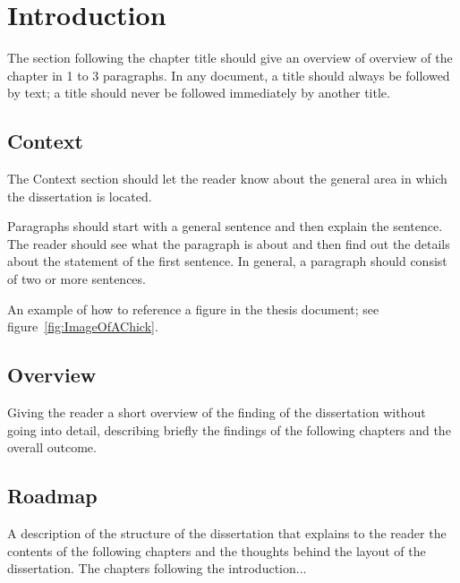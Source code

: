 \chapter{Introduction}

The section following the chapter title should give an overview of overview of the chapter in 1 to 3 paragraphs. In any document, a title should always be followed by text; a title should never be followed immediately by another title.


\section{Context}

The Context section should let the reader know about the general area in which the dissertation is located.

Paragraphs should start with a general sentence and then explain the sentence. The reader should see what the paragraph is about and then find out the details about the statement of the first sentence. In general, a paragraph should consist of two or more sentences. 

An example of how to reference a figure in the thesis document; see figure~\ref{fig:ImageOfAChick}.



\section{Overview} 

Giving the reader a short overview of the finding of the dissertation without going into detail, describing briefly the findings of the following chapters and the overall outcome.


\section{Roadmap}

A description of the structure of the dissertation that explains to the reader the contents of the following chapters and the thoughts behind the layout of the dissertation. The chapters following the introduction...